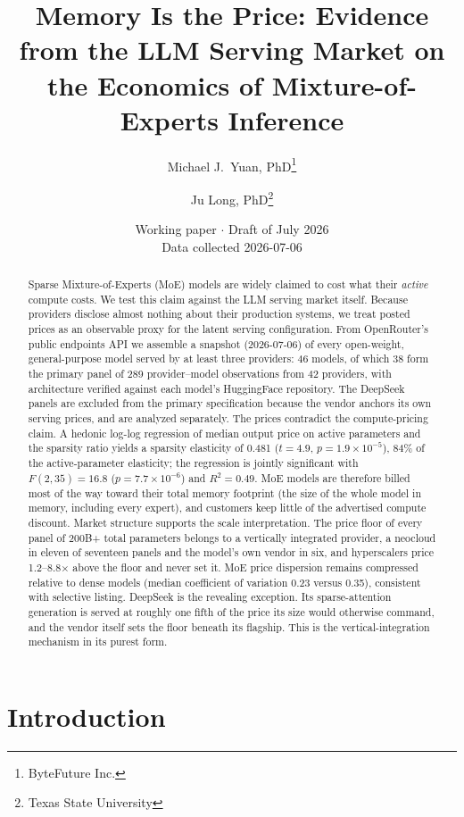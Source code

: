 \documentclass[11pt]{article}
\title{Memory Is the Price: Evidence from the LLM Serving Market on the
Economics of Mixture-of-Experts Inference}
\author{Michael J.\ Yuan, PhD\thanks{ByteFuture Inc.} \and Ju Long, PhD\thanks{Texas State University}}
\date{Working paper $\cdot$ Draft of July 2026\\\small Data collected 2026-07-06}
\begin{document}
\maketitle

\begin{abstract}
Sparse Mixture-of-Experts (MoE) models are widely claimed to cost what their
\emph{active} compute costs. We test this claim against the LLM serving
market itself. Because providers disclose almost nothing about their
production systems, we treat posted prices as an observable proxy for the
latent serving configuration. From OpenRouter's public endpoints API we
assemble a snapshot (2026-07-06) of every open-weight, general-purpose model
served by at least three providers: 46 models, of which 38 form the primary
panel of 289 provider--model observations from 42 providers, with
architecture verified against each model's HuggingFace repository. The
DeepSeek panels are excluded from the primary specification because the
vendor anchors its own serving prices, and are analyzed separately. The
prices contradict the compute-pricing claim. A hedonic log-log regression of
median output price on active parameters and the sparsity ratio yields a
sparsity elasticity of 0.481 ($t = 4.9$, $p = 1.9 \times 10^{-5}$), 84\% of
the active-parameter elasticity; the regression is jointly significant with
$F(2,35) = 16.8$ ($p = 7.7 \times 10^{-6}$) and $R^2 = 0.49$. MoE models are
therefore billed most of the way toward their total memory footprint (the
size of the whole model in memory, including every expert), and customers
keep little of the advertised compute discount. Market structure
supports the scale interpretation. The price floor of every panel of
200B+ total parameters belongs to a vertically integrated provider, a
neocloud in eleven of seventeen panels and the model's own vendor in six,
and hyperscalers price 1.2--8.8$\times$ above the floor and never set it.
MoE price dispersion remains compressed relative to dense models (median
coefficient of variation 0.23 versus 0.35), consistent with selective
listing. DeepSeek is the revealing exception. Its sparse-attention generation is
served at roughly one fifth of the price its size would otherwise command,
and the vendor itself sets the floor beneath its flagship. This is the
vertical-integration mechanism in its purest form.
\end{abstract}

\section{Introduction}
\label{sec:intro}
\end{document}
